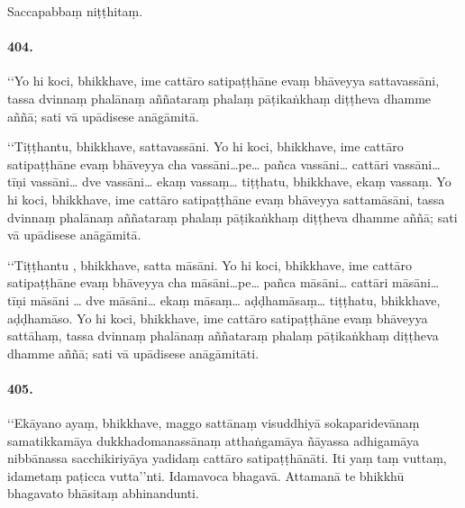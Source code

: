 Saccapabbaṃ niṭṭhitaṃ.


\paragraph{404.} ‘‘Yo hi koci, bhikkhave, ime cattāro satipaṭṭhāne evaṃ bhāveyya sattavassāni, tassa dvinnaṃ phalānaṃ aññataraṃ phalaṃ pāṭikaṅkhaṃ diṭṭheva dhamme aññā; sati vā upādisese anāgāmitā.

‘‘Tiṭṭhantu, bhikkhave, sattavassāni. Yo hi koci, bhikkhave, ime cattāro satipaṭṭhāne evaṃ bhāveyya cha vassāni…pe… pañca vassāni… cattāri vassāni… tīṇi vassāni… dve vassāni… ekaṃ vassaṃ… tiṭṭhatu, bhikkhave, ekaṃ vassaṃ. Yo hi koci, bhikkhave, ime cattāro satipaṭṭhāne evaṃ bhāveyya sattamāsāni, tassa dvinnaṃ phalānaṃ aññataraṃ phalaṃ pāṭikaṅkhaṃ diṭṭheva dhamme aññā; sati vā upādisese anāgāmitā.

‘‘Tiṭṭhantu , bhikkhave, satta māsāni. Yo hi koci, bhikkhave, ime cattāro satipaṭṭhāne evaṃ bhāveyya cha māsāni…pe… pañca māsāni… cattāri māsāni… tīṇi māsāni … dve māsāni… ekaṃ māsaṃ… aḍḍhamāsaṃ… tiṭṭhatu, bhikkhave, aḍḍhamāso. Yo hi koci, bhikkhave, ime cattāro satipaṭṭhāne evaṃ bhāveyya sattāhaṃ, tassa dvinnaṃ phalānaṃ aññataraṃ phalaṃ pāṭikaṅkhaṃ diṭṭheva dhamme aññā; sati vā upādisese anāgāmitāti.

\paragraph{405.} ‘‘Ekāyano ayaṃ, bhikkhave, maggo sattānaṃ visuddhiyā sokaparidevānaṃ samatikkamāya dukkhadomanassānaṃ atthaṅgamāya ñāyassa adhigamāya nibbānassa sacchikiriyāya yadidaṃ cattāro satipaṭṭhānāti. Iti yaṃ taṃ vuttaṃ, idametaṃ paṭicca vutta’’nti. Idamavoca bhagavā. Attamanā te bhikkhū bhagavato bhāsitaṃ abhinandunti.

